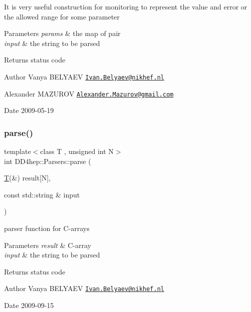 It is very useful construction for monitoring to represent the value and error or the allowed range for some parameter 
\begin{DoxyParams}{Parameters}
{\em params} & the map of pair \\
\hline
{\em input} & the string to be parsed \\
\hline
\end{DoxyParams}
\begin{DoxyReturn}{Returns}
status code 
\end{DoxyReturn}
\begin{DoxyAuthor}{Author}
Vanya B\+E\+L\+Y\+A\+EV \href{mailto:Ivan.Belyaev@nikhef.nl}{\tt Ivan.\+Belyaev@nikhef.\+nl} 

Alexander M\+A\+Z\+U\+R\+OV \href{mailto:Alexander.Mazurov@gmail.com}{\tt Alexander.\+Mazurov@gmail.\+com} 
\end{DoxyAuthor}
\begin{DoxyDate}{Date}
2009-\/05-\/19 
\end{DoxyDate}
\hypertarget{namespace_d_d4hep_1_1_parsers_a3a2c641257cdea105bf397df609731f5}{}\label{namespace_d_d4hep_1_1_parsers_a3a2c641257cdea105bf397df609731f5} 
\subsubsection{\texorpdfstring{parse()}{parse()}\hspace{0.1cm}{\footnotesize\ttfamily [17/21]}}
{\footnotesize\ttfamily template$<$class T , unsigned int N$>$ \\
int D\+D4hep\+::\+Parsers\+::parse (\begin{DoxyParamCaption}\item[{\hyperlink{class_t}{T}(\&)}]{result\mbox{[}\+N\mbox{]},  }\item[{const std\+::string \&}]{input }\end{DoxyParamCaption})}



parser function for C-\/arrays 


\begin{DoxyParams}{Parameters}
{\em result} & C-\/array \\
\hline
{\em input} & the string to be parsed \\
\hline
\end{DoxyParams}
\begin{DoxyReturn}{Returns}
status code 
\end{DoxyReturn}
\begin{DoxyAuthor}{Author}
Vanya B\+E\+L\+Y\+A\+EV \href{mailto:Ivan.Belyaev@nikhef.nl}{\tt Ivan.\+Belyaev@nikhef.\+nl} 
\end{DoxyAuthor}
\begin{DoxyDate}{Date}
2009-\/09-\/15 
\end{DoxyDate}



